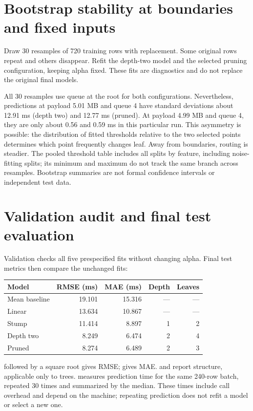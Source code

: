 \section{Bootstrap stability at boundaries and fixed inputs}
Draw 30 resamples of 720 training rows with replacement. Some original rows repeat and others disappear. Refit the depth-two model and the selected pruning configuration, keeping alpha fixed. These fits are diagnostics and do not replace the original final models.

All 30 resamples use queue at the root for both configurations. Nevertheless, predictions at payload 5.01 MB and queue 4 have standard deviations about 12.91 ms (depth two) and 12.77 ms (pruned). At payload 4.99 MB and queue 4, they are only about 0.56 and 0.59 ms in this particular run.
This asymmetry is possible: the distribution of fitted thresholds relative to the two selected points determines which point frequently changes leaf. Away from boundaries, routing is steadier. The pooled threshold table includes all splits by feature, including noise-fitting splits; its minimum and maximum do not track the same branch across resamples. Bootstrap summaries are not formal confidence intervals or independent test data.

\section{Validation audit and final test evaluation}
Validation checks all five prespecified fits without changing alpha. Final test metrics then compare the unchanged fits:
\begin{center}
\begin{tabular}{lrrrr}\toprule
Model&RMSE (ms)&MAE (ms)&Depth&Leaves\\\midrule
Mean baseline&19.101&15.316&---&---\\
Linear&13.634&10.867&---&---\\
Stump&11.414&8.897&1&2\\
Depth two&8.249&6.474&2&4\\
Pruned&8.274&6.489&2&3\\\bottomrule
\end{tabular}
\end{center}
 followed by a square root gives RMSE;  gives MAE.  and  report structure, applicable only to trees.  measures prediction time for the same 240-row batch, repeated 30 times and summarized by the median. These times include call overhead and depend on the machine; repeating prediction does not refit a model or select a new one.

